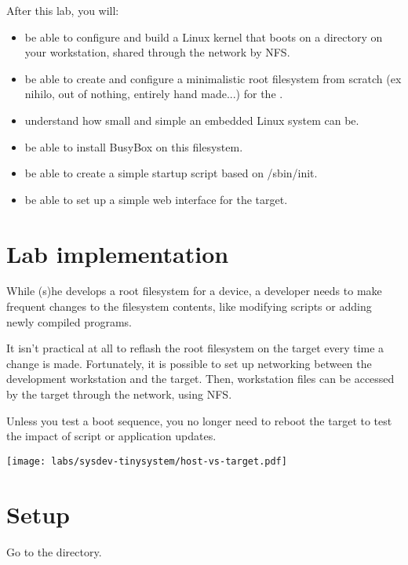 
After this lab, you will:
\begin{itemize}
\item be able to configure and build a Linux kernel that boots on a
  directory on your workstation, shared through the network by NFS.
\item be able to create and configure a minimalistic root filesystem
  from scratch (ex nihilo, out of nothing, entirely hand made...) for
  the .
\item understand how small and simple an embedded Linux system can be.
\item be able to install BusyBox on this filesystem.
\item be able to create a simple startup script based on /sbin/init.
\item be able to set up a simple web interface for the target.
\end{itemize}

\section{Lab implementation}

While (s)he develops a root filesystem for a device, a developer needs
to make frequent changes to the filesystem contents, like modifying
scripts or adding newly compiled programs.

It isn't practical at all to reflash the root filesystem on the target
every time a change is made. Fortunately, it is possible to set up
networking between the development workstation and the target. Then,
workstation files can be accessed by the target through the network,
using NFS.

Unless you test a boot sequence, you no longer need to reboot the
target to test the impact of script or application updates.

\begin{center}
\texttt{[image: labs/sysdev-tinysystem/host-vs-target.pdf]}
\end{center}

\section{Setup}

Go to the  directory.

